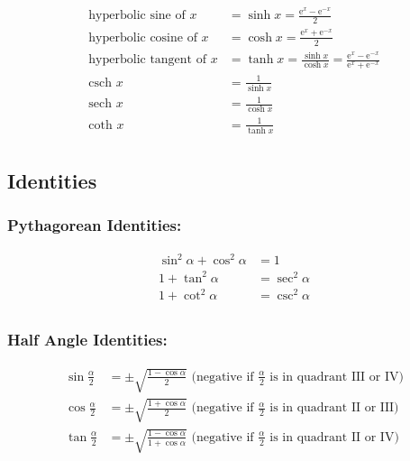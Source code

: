 \documentclass[
]{book}
\begin{document}
\begin{align}
\text{hyperbolic sine of } x &= \sinh{x} = \frac{\mathrm{e}^x - \mathrm{e}^{-x}}{2} \\
\text{hyperbolic cosine of } x &= \cosh{x} = \frac{\mathrm{e}^x + \mathrm{e}^{-x}}{2} \\
\text{hyperbolic tangent of } x &= \tanh{x} = \frac{\sinh{x}}{\cosh{x}} = \frac{\mathrm{e}^x - \mathrm{e}^{-x}}{\mathrm{e}^x + \mathrm{e}^{-x}} \\
\text{csch } x &= \frac{1}{\sinh{x}} \\
\text{sech } x &= \frac{1}{\cosh{x}} \\
\text{coth } x &= \frac{1}{\tanh{x}} \\
\end{align}

\hypertarget{identities-1}{%
\subsection*{Identities}\label{identities-1}}

\hypertarget{pythagorean-identities}{%
\subsubsection*{Pythagorean Identities:}\label{pythagorean-identities}}

\begin{align}
\sin^2{\alpha} + \cos^2{\alpha} &= 1 \\
1 + \tan^2{\alpha} &= \sec^2{\alpha} \\
1 + \cot^2{\alpha} &= \csc^2{\alpha} \\
\end{align}

\hypertarget{half-angle-identities}{%
\subsubsection*{Half Angle Identities:}\label{half-angle-identities}}

\begin{align}
\sin{\frac{\alpha}{2}} &= \pm \sqrt{\frac{1 - \cos{\alpha}}{2}} \text{ (negative if } \frac{\alpha}{2} \text{ is in quadrant III or IV)}\\
\cos{\frac{\alpha}{2}} &= \pm \sqrt{\frac{1 + \cos{\alpha}}{2}} \text{ (negative if } \frac{\alpha}{2} \text{ is in quadrant II or III)}\\
\tan{\frac{\alpha}{2}} &= \pm \sqrt{\frac{1 - \cos{\alpha}}{1 + \cos{\alpha}}} \text{ (negative if } \frac{\alpha}{2} \text{ is in quadrant II or IV)}\\
\end{align}
\end{document}
